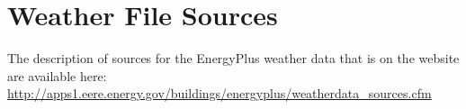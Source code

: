 \section{Weather File Sources}\label{weather-file-sources}

The description of sources for the EnergyPlus weather data that is on the website are available here: \url{http://apps1.eere.energy.gov/buildings/energyplus/weatherdata_sources.cfm}
